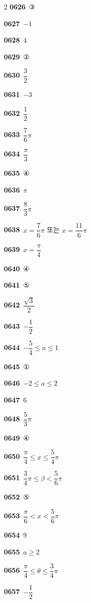 \documentclass[10pt,a4paper]{article}
\begin{document}
\begin{multicols}{2}
\noindent\textbf{0626}\ ③\par
\noindent\textbf{0627}\ $-1$\par
\noindent\textbf{0628}\ $4$\par
\noindent\textbf{0629}\ ②\par
\noindent\textbf{0630}\ $\dfrac{3}{2}$\par
\noindent\textbf{0631}\ $-3$\par
\noindent\textbf{0632}\ $\dfrac{1}{2}$\par
\noindent\textbf{0633}\ $\dfrac{7}{6}\pi$\par
\noindent\textbf{0634}\ $\dfrac{\pi}{3}$\par
\noindent\textbf{0635}\ ④\par
\noindent\textbf{0636}\ $\pi$\par
\noindent\textbf{0637}\ $\dfrac{8}{3}\pi$\par
\noindent\textbf{0638}\ $x=\dfrac{7}{6}\pi$ 또는 $x=\dfrac{11}{6}\pi$\par
\noindent\textbf{0639}\ $x=\dfrac{\pi}{4}$\par
\noindent\textbf{0640}\ ④\par
\noindent\textbf{0641}\ ⑤\par
\noindent\textbf{0642}\ $\dfrac{\sqrt{3}}{2}$\par
\noindent\textbf{0643}\ $-\dfrac{1}{2}$\par
\noindent\textbf{0644}\ $-\dfrac{5}{4}\le a\le 1$\par
\noindent\textbf{0645}\ ①\par
\noindent\textbf{0646}\ $-2\le a\le 2$\par
\noindent\textbf{0647}\ $6$\par
\noindent\textbf{0648}\ $\dfrac{5}{3}\pi$\par
\noindent\textbf{0649}\ ④\par
\noindent\textbf{0650}\ $\dfrac{\pi}{4}\le x\le\dfrac{5}{4}\pi$\par
\noindent\textbf{0651}\ $\dfrac{3}{4}\pi\le\beta<\dfrac{5}{6}\pi$\par
\noindent\textbf{0652}\ ⑤\par
\noindent\textbf{0653}\ $\dfrac{\pi}{6}<x<\dfrac{5}{6}\pi$\par
\noindent\textbf{0654}\ $9$\par
\noindent\textbf{0655}\ $a\ge 2$\par
\noindent\textbf{0656}\ $\dfrac{\pi}{4}\le\theta\le\dfrac{3}{4}\pi$\par
\noindent\textbf{0657}\ $-\dfrac{1}{2}$\par

\end{multicols}
\end{document}
